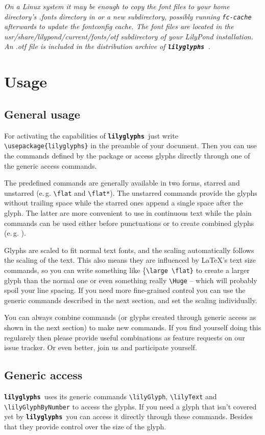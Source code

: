 \documentclass{article}
\newcommand{\lilyglyphs}{\texttt{\textbf{lilyglyphs\,}}}
\newcommand*{\cmd}[1]{\texttt{\textbackslash #1}}
\begin{document}
\textit{On a Linux system it may be enough to copy the font files to your home directory's .fonts directory in or a new subdirectory, possibly running \texttt{fc-cache} afterwards to update the fontconfig cache. 
The font files are located in the usr/share/lilypond/current/fonts/otf subdirectory of your LilyPond installation. 
An .otf file is included in the distribution archive of \lilyglyphs.}



\section{Usage}
\subsection{General usage}
For activating the capabilities of \lilyglyphs just write \cmd{usepackage\{lilyglyphs\}} in the preamble of your document. 
Then you can use the commands defined by the package or access glyphs directly through one of the generic access commands.

The predefined commands are generally available in two forms, starred and unstarred (e.\,g. \cmd{flat} and \cmd{flat*}). 
The unstarred commands provide the glyphs without trailing space while the starred ones append a single space after the glyph. 
The latter are more convenient to use in continuous text while the plain commands can be used either before punctuations or to create combined glyphs (e.\,g. ).

Glyphs are scaled to fit normal text fonts, and the scaling automatically follows the scaling of the text. 
This also means they are influenced by \LaTeX 's text size commands, so you can write something like \{\cmd{large \textbackslash flat\}} to create a larger {\large \flat} glyph than the normal \flat* one or even something really \cmd{Huge} {\Huge {}} -- which will probably spoil your line spacing. 
If you need more fine-grained control you can use the generic commands described in the next section, and set the scaling individually.

You can always combine commands (or glyphs created through generic access as shown in the next section) to make new commands. 
If you find yourself doing this regularely then please provide useful combinations as feature requests on our issue tracker. 
Or even better, join us and participate yourself.



\subsection{Generic access}
\lilyglyphs uses its generic commands \cmd{lilyGlyph}, \cmd{lilyText} and \cmd{lilyGlyphByNumber} to access the glyphs. 
If you need a glyph that isn't covered yet by \lilyglyphs you can access it directly through these commands. 
Besides that they provide control over the size of the glyph.
\end{document}
